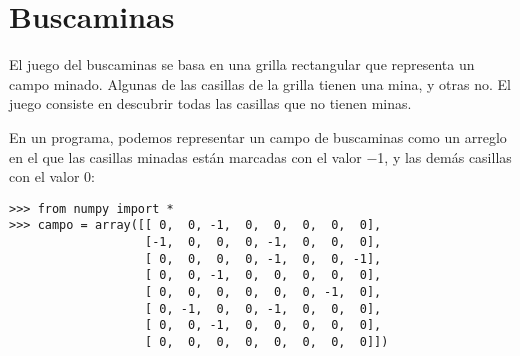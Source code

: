 \section{Buscaminas}

El juego del buscaminas se basa en una grilla rectangular que representa
un campo minado. Algunas de las casillas de la grilla tienen una mina, y
otras no. El juego consiste en descubrir todas las casillas que no
tienen minas.

En un programa, podemos representar un campo de buscaminas como un
arreglo en el que las casillas minadas están marcadas con el valor −1, y
las demás casillas con el valor 0:

\begin{lstlisting}
>>> from numpy import *
>>> campo = array([[ 0,  0, -1,  0,  0,  0,  0,  0],
                   [-1,  0,  0,  0, -1,  0,  0,  0],
                   [ 0,  0,  0,  0, -1,  0,  0, -1],
                   [ 0,  0, -1,  0,  0,  0,  0,  0],
                   [ 0,  0,  0,  0,  0,  0, -1,  0],
                   [ 0, -1,  0,  0, -1,  0,  0,  0],
                   [ 0,  0, -1,  0,  0,  0,  0,  0],
                   [ 0,  0,  0,  0,  0,  0,  0,  0]])
\end{lstlisting}

